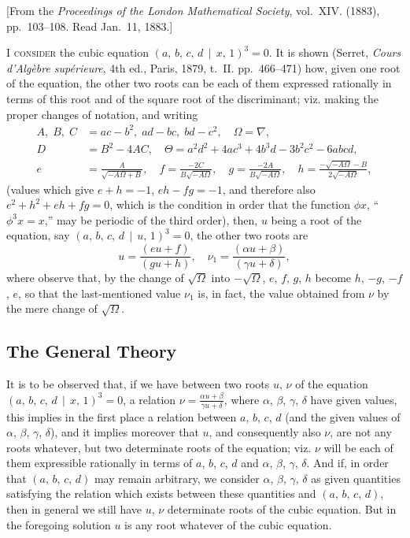 \documentclass[11pt,a4paper]{book}
\begin{document}
\begin{center}
[From the \textit{Proceedings of the London Mathematical Society}, vol.~XIV. (1883), pp.~103--108. Read Jan.~11, 1883.]
\end{center}

\textsc{I consider} the cubic equation $(a,\, b,\, c,\, d \,\!\!\mid\!\!\, x,\, 1)^{3} = 0$. It is shown (Serret, \textit{Cours d'Alg\`{e}bre sup\'{e}rieure}, 4th ed., Paris, 1879, t.~II. pp.~466--471) how, given one root of the equation, the other two roots can be each of them expressed rationally in terms of this root and of the square root of the discriminant; viz. making the proper changes of notation, and writing
\begin{align*}
A,\; B,\; C &= ac - b^{2},\; ad - bc,\; bd - c^{2},\quad \Omega = \nabla,\\
D &= B^{2} - 4AC,\quad \Theta = a^{2}d^{2} + 4ac^{3} + 4b^{3}d - 3b^{2}c^{2} - 6abcd,\\
e &= \frac{A}{\sqrt{-A\Omega + B}},\quad
f = \frac{-2C}{B\sqrt{-A\Omega}},\quad
g = \frac{-2A}{B\sqrt{-A\Omega}},\quad
h = \frac{-\sqrt{-A\Omega} - B}{2\sqrt{-A\Omega}},
\end{align*}
(values which give $e+h = -1$, $eh - fg = -1$, and therefore also $e^{2} + h^{2} + eh + fg = 0$, which is the condition in order that the function $\phi x$, ``$\phi^{3}x = x$,'' may be periodic of the third order), then, $u$ being a root of the equation, say $(a,\, b,\, c,\, d \,\!\!\mid\!\!\, u,\, 1)^{3} = 0$, the other two roots are
\[
u = \frac{(eu + f)}{(gu + h)},\quad \nu_{1} = \frac{(\alpha u + \beta)}{(\gamma u + \delta)},
\]
where observe that, by the change of $\sqrt{\Omega}$ into $-\sqrt{\Omega}$, $e$, $f$, $g$, $h$ become $h$, $-g$, $-f$, $e$, so that the last-mentioned value $\nu_{1}$ is, in fact, the value obtained from $\nu$ by the mere change of $\sqrt{\Omega}$.

\subsection*{The General Theory}

It is to be observed that, if we have between two roots $u$, $\nu$ of the equation $(a,\, b,\, c,\, d \,\!\!\mid\!\!\, x,\, 1)^{3} = 0$, a relation $\nu = \frac{\alpha u + \beta}{\gamma u + \delta}$, where $\alpha$, $\beta$, $\gamma$, $\delta$ have given values, this implies in the first place a relation between $a$, $b$, $c$, $d$ (and the given values of $\alpha$, $\beta$, $\gamma$, $\delta$), and it implies moreover that $u$, and consequently also $\nu$, are not any roots whatever, but two determinate roots of the equation; viz. $\nu$ will be each of them expressible rationally in terms of $a$, $b$, $c$, $d$ and $\alpha$, $\beta$, $\gamma$, $\delta$. And if, in order that $(a,\, b,\, c,\, d)$ may remain arbitrary, we consider $\alpha$, $\beta$, $\gamma$, $\delta$ as given quantities satisfying the relation which exists between these quantities and $(a,\, b,\, c,\, d)$, then in general we still have $u$, $\nu$ determinate roots of the cubic equation. But in the foregoing solution $u$ is any root whatever of the cubic equation.
\end{document}
